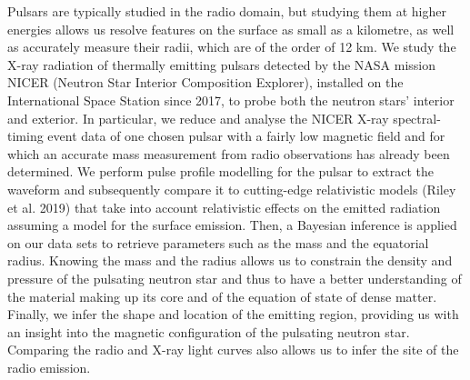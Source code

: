 \documentclass[a4paper, twoside, 12pt]{article}
\numberwithin{equation}{section}
\newcommand{\thesisauthor}{\textsc{Issa} Lina}
\begin{document}
\hspace{\parindent}	 Pulsars are typically studied in the radio domain, but studying them at higher energies allows us resolve features on the surface as small as a kilometre, as well as accurately measure their radii, which are of the order of 12 km. We study the X-ray radiation of thermally emitting pulsars detected by the NASA mission NICER (Neutron Star Interior Composition Explorer), installed on the International Space Station since 2017, to probe both the neutron stars' interior and exterior. In particular, we reduce and analyse the NICER X-ray spectral-timing event data of one chosen pulsar with a fairly low magnetic field and for which an accurate mass measurement from radio observations has already been determined.  We perform pulse profile modelling for the pulsar to extract the waveform and subsequently compare it to cutting-edge relativistic models (Riley et al. 2019) that take into account relativistic effects on the emitted radiation assuming a model for the surface emission.  Then, a Bayesian inference is applied on our data sets to retrieve parameters such as the mass and the equatorial radius. Knowing the mass and the radius allows us to constrain the density and pressure of the pulsating neutron star and thus to have a better understanding of the material making up its core and of the equation of state of dense matter. Finally, we infer the shape and location of the emitting region, providing us with an insight into the magnetic configuration of the pulsating neutron star. Comparing the radio and X-ray light curves also allows us to infer the site of the radio emission.

\newpage

\pagestyle{fancy}
\fancyhead{}
\fancyhead[LE,RO]{\textsl{\leftmark}}
\fancyhead[RE,LO]{\thesisauthor}
\tableofcontents
\pagebreak
\listoffigures
\newpage
\end{document}
